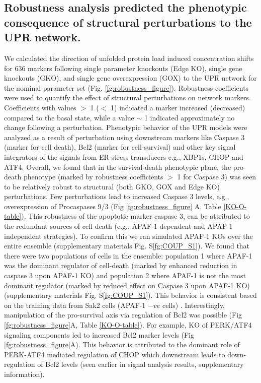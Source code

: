 \documentclass[fleqn,10pt]{wlscirep}
\begin{document}
\subsection*{Robustness analysis predicted the phenotypic consequence of structural perturbations to the UPR network.}
We calculated the direction of unfolded protein load induced concentration shifts for 636 markers following single parameter knockouts (Edge KO), single gene knockouts (GKO), and single gene overexpression (GOX) to the UPR network for the nominal parameter set (Fig. \ref{fg:robustness_figure}).
Robustness coefficients were used to quantify the effect of structural perturbations on network markers.
Coefficients with values $>$ 1 ($<$ 1) indicated a marker increased (decreased) compared to the basal state, while a value $\sim$ 1 indicated approximately no change following a perturbation.
Phenotypic behavior of the UPR models were analyzed as a result of perturbation using downstream markers like Caspase 3 (marker for cell death), Bcl2 (marker for cell-survival) and other key signal integrators of the signals from ER stress transducers e.g., XBP1s, CHOP and ATF4.
Overall, we found that in the survival-death phenotypic plane, the pro-death phenotype (marked by robustness coefficients $>$ 1 for Caspase 3) was seen to be relatively robust to structural (both GKO, GOX and Edge KO) perturbations.
Few perturbations lead to increased Caspase 3 levels, e.g., overexpression of Procaspases 9/3 (Fig \ref{fg:robustness_figure} A, Table \ref{KO-O-table}).
This robustness of the apoptotic marker caspase 3, can be attributed to the redundant sources of cell death (e.g., APAF-1 dependent and APAF-1 independent strategies).
To confirm this we ran simulated APAF-1 KOs over the entire ensemble (supplementary materials Fig. S\ref{fg:COUP_S1}). We found that there were two populations of cells in the ensemble: population 1 where APAF-1 was the dominant regulator of cell-death (marked by enhanced reduction in caspase 3 upon APAF-1 KO) and population 2 where APAF-1 is not the most dominant regulator (marked by reduced effect on Caspase 3 upon APAF-1 KO) (supplementary materials Fig. S\ref{fg:COUP_S1}).
This behavior is consistent based on the training data from Sak2 cells (APAF-1 $-ve$ cells) \cite{rao2002cer}.
Interestingly, manipulation of the pro-survival axis via regulation of Bcl2 was possible (Fig \ref{fg:robustness_figure}A, Table \ref{KO-O-table}).
For example, KO of PERK/ATF4 signaling components led to increased Bcl2 marker levels (Fig \ref{fg:robustness_figure}A).
This behavior is attributed to the dominant role of PERK-ATF4 mediated regulation of CHOP which downstream leads to down-regulation of Bcl2 levels (seen earlier in signal analysis results, supplementary information).
\end{document}
